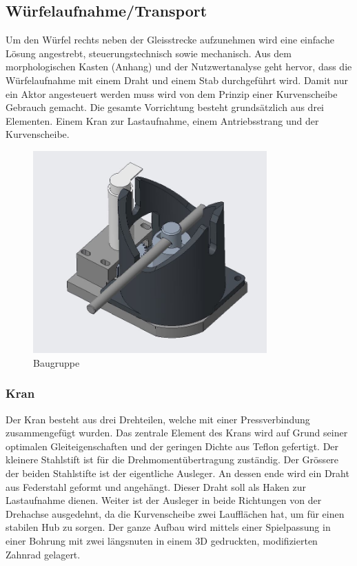 \documentclass[../../main.tex]{subfiles}
\begin{document}
    \subsection{Würfelaufnahme/Transport}
         Um den Würfel rechts neben der Gleisstrecke aufzunehmen wird eine einfache Lösung angestrebt, steuerungstechnisch sowie mechanisch. Aus dem morphologischen Kasten (Anhang) und der Nutzwertanalyse geht hervor, dass die Würfelaufnahme mit einem Draht und einem Stab durchgeführt wird. Damit nur ein Aktor angesteuert werden muss wird von dem Prinzip einer Kurvenscheibe Gebrauch gemacht.  Die gesamte Vorrichtung besteht grundsätzlich aus drei Elementen. Einem Kran zur Lastaufnahme, einem Antriebsstrang und der Kurvenscheibe.

        \begin{figure}[H]
            \centering
            \includegraphics[width=0.8\textwidth]{../../images/Kran/BG.JPG}
            \caption {Baugruppe}
            \label{fig:et_komponenten}
        \end{figure}

    \subsubsection{Kran}
         Der Kran besteht aus drei Drehteilen, welche mit einer Pressverbindung zusammengefügt wurden. Das zentrale Element des Krans wird auf Grund seiner optimalen Gleiteigenschaften und der geringen Dichte aus Teflon gefertigt. Der kleinere Stahlstift ist für die Drehmomentübertragung zuständig. Der Grössere der beiden Stahlstifte ist der eigentliche Ausleger. An dessen ende wird ein Draht aus Federstahl geformt und angehängt. Dieser Draht soll als Haken zur Lastaufnahme dienen. Weiter ist der Ausleger in beide Richtungen von der Drehachse ausgedehnt, da die Kurvenscheibe zwei Laufflächen hat, um für einen stabilen Hub zu sorgen. Der ganze Aufbau wird mittels einer Spielpassung in einer Bohrung mit zwei längsnuten in einem 3D gedruckten, modifizierten Zahnrad gelagert.  
\end{document}
